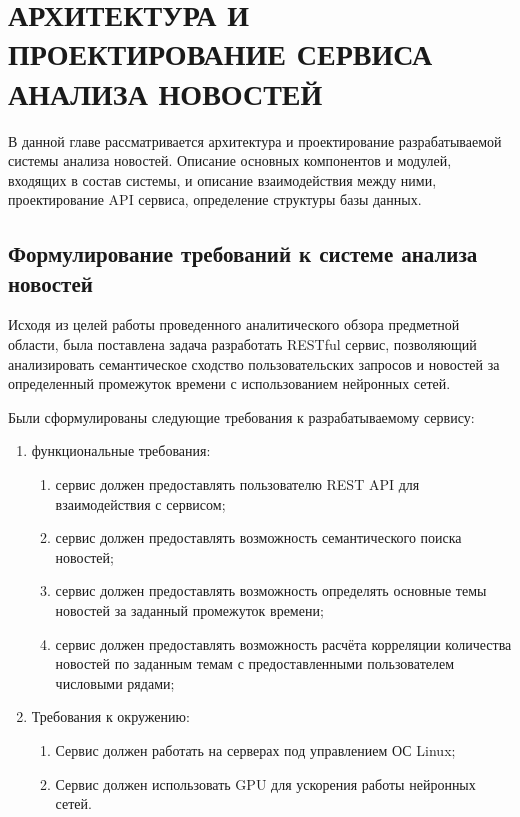 \chapter{АРХИТЕКТУРА И ПРОЕКТИРОВАНИЕ СЕРВИСА АНАЛИЗА НОВОСТЕЙ}
\label{chap:arch_design}
\aftertitle

В данной главе рассматривается архитектура и проектирование разрабатываемой системы анализа новостей. Описание основных компонентов и модулей, входящих в состав системы, и описание взаимодействия между ними, проектирование API сервиса, определение структуры базы данных.

\section{Формулирование требований к системе анализа новостей}
Исходя из целей работы проведенного аналитического обзора предметной области, была поставлена задача разработать RESTful сервис, позволяющий анализировать семантическое сходство пользовательских запросов и новостей за определенный промежуток времени с использованием нейронных сетей.

Были сформулированы следующие требования к разрабатываемому сервису:

\begin{enumerate}
    \item функциональные требования:
    \begin{enumerate}
        \item сервис должен предоставлять пользователю REST API для взаимодействия с сервисом;
        \item сервис должен предоставлять возможность семантического поиска новостей;
        \item сервис должен предоставлять возможность определять основные темы новостей за заданный промежуток времени;
        \item сервис должен предоставлять возможность расчёта корреляции количества новостей по заданным темам с предоставленными пользователем числовыми рядами;
    \end{enumerate}
    \item Требования к окружению:
    \begin{enumerate}
        \item Сервис должен работать на серверах под управлением ОС Linux;
        \item Сервис должен использовать GPU для ускорения работы нейронных сетей.
    \end{enumerate}
\end{enumerate}


